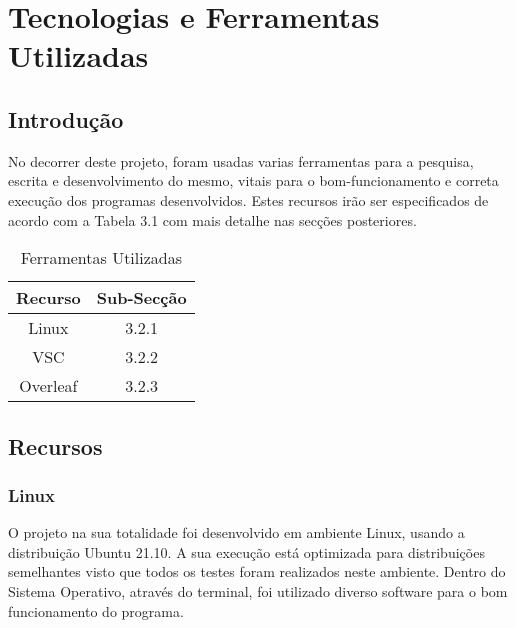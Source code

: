 \chapter{Tecnologias e Ferramentas Utilizadas}
\label{chap:tecno-ferra}

\section{Introdução}
\label{chap3:sec:intro}
No decorrer deste projeto, foram usadas varias ferramentas para a pesquisa, escrita e desenvolvimento do mesmo, vitais para o bom-funcionamento e correta execução dos programas desenvolvidos. Estes recursos irão ser especificados de acordo com a Tabela 3.1 com mais detalhe nas secções posteriores.

\begin{table}
\centering
\begin{tabular}{|c|c|}
\hline
\textbf{Recurso} & \textbf{Sub-Secção}\\
\hline
\hline
Linux & 3.2.1 \\
\hline	
VSC & 3.2.2 \\
\hline
Overleaf & 3.2.3 \\
\hline
\end{tabular}
\caption{Ferramentas Utilizadas}
\label{tab:tools}
\end{table}

\section{Recursos}
\label{chap3:rec:int}

\subsection{Linux}
\label{chap3:rec:linux}
O projeto na sua totalidade foi desenvolvido em ambiente Linux, usando a distribuição Ubuntu 21.10.
A sua execução está optimizada para distribuições semelhantes visto que todos os testes foram realizados neste ambiente. Dentro do Sistema Operativo, através do terminal, foi utilizado diverso software para o bom funcionamento do programa.

